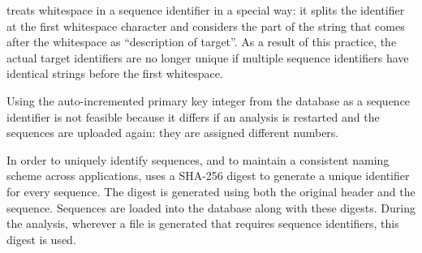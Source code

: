 \label{sec:digests}
 treats whitespace in a sequence identifier in a special way: it
splits the identifier at the first whitespace character and considers the part
of the string that comes after the whitespace as ``description of target''. As a
result of this practice, the actual target identifiers are no longer unique if
multiple sequence identifiers have identical strings before the first
whitespace.

Using the auto-incremented primary key integer from the database as a sequence
identifier is not feasible because it differs if an analysis is restarted and
the sequences are uploaded again: they are assigned different numbers. 

In order to uniquely identify sequences, and to maintain a consistent naming
scheme across applications, \pname uses a SHA-256 digest \citep{gallagher2008}
to generate a unique identifier for every sequence. The digest is generated
using both the original header and the sequence. Sequences are loaded into the
database along with these digests. During the analysis, wherever a file is
generated that requires sequence identifiers, this digest is used. 
